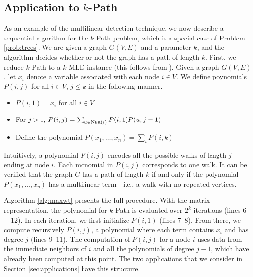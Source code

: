 \subsection{Application to $k$-Path}
As an example of the multilinear detection technique, we now describe a sequential algorithm for the $k$-Path problem, which is a special case of Problem \ref{prob:trees}. We are given a graph $G(V,E)$ and a parameter $k$, and the algorithm decides whether or not the graph has a path of length $k$. First, we reduce $k$-Path to a $k$-MLD instance (this follows from \cite{koutis:icalp08, williams2009finding}). Given a graph $G(V, E)$, let $x_i$ denote a variable associated with each node $i\in V$.
We define poynomials $P(i, j)$ for all $i\in V$, $j\leq k$ in the following manner.

\begin{itemize}
\item
$P(i, 1) = x_i$ for all $i\in V$
\item
For $j>1$,
$P(i, j) = \sum_{u\in\textsc{Nbr}(i)} P(i,1)P(u, j-1)$
\item
Define the polynomial $P(x_1,\ldots,x_n) = \sum_i P(i, k)$
\end{itemize}

Intuitively, a polynomial $P(i, j)$ encodes all the possible walks of length $j$ ending at node $i$. Each monomial in $P(i,j)$ corresponds to one walk. It can be verified that the graph $G$ has a path of length $k$ if and only if the polynomial $P(x_1,\ldots,x_n)$ has a multilinear term---i.e., a walk with no repeated vertices. 

Algorithm \ref{alg:maxwt} presents the full procedure. With the matrix representation, the polynomial for $k$-Path is evaluated over $2^k$ iterations (lines 6---12). In each iteration, we first initialize $P(i, 1)$
(lines 7--8). From there, we compute recursively $P(i,j)$, a polynomial where each term contains $x_i$ and has degree $j$ (lines 9--11). The computation of $P(i,j)$ for a node $i$ uses data from the immediate neighbors of $i$ and all the polynomials of degree $j-1$, which have already been computed at this point. The two applications that we consider in Section \ref{sec:applications} have this structure.

